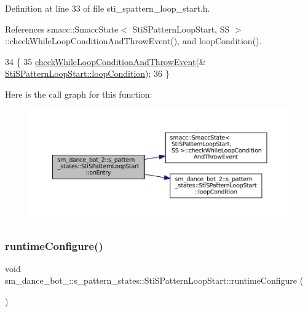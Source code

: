 Definition at line 33 of file sti\+\_\+spattern\+\_\+loop\+\_\+start.\+h.



References smacc\+::\+Smacc\+State$<$ Sti\+S\+Pattern\+Loop\+Start, S\+S $>$\+::check\+While\+Loop\+Condition\+And\+Throw\+Event(), and loop\+Condition().


\begin{DoxyCode}
34   \{
35     \hyperlink{classsmacc_1_1SmaccState_a80082718f226bebedb589f0c4696001d}{checkWhileLoopConditionAndThrowEvent}(&
      \hyperlink{structsm__dance__bot__2_1_1s__pattern__states_1_1StiSPatternLoopStart_afc9d41599d4ac143e063d19d647480dd}{StiSPatternLoopStart::loopCondition});
36   \}
\end{DoxyCode}
Here is the call graph for this function\+:
\nopagebreak
\begin{figure}[H]
\begin{center}
\leavevmode
\includegraphics[width=350pt]{structsm__dance__bot__2_1_1s__pattern__states_1_1StiSPatternLoopStart_aa42d37cd2af3150d8a5c140932eeb9ea_cgraph}
\end{center}
\end{figure}
\mbox{\label{structsm__dance__bot__2_1_1s__pattern__states_1_1StiSPatternLoopStart_a9285d532e157456abb87858ec9a4fb11}} 
\subsubsection{\texorpdfstring{runtime\+Configure()}{runtimeConfigure()}}
{\footnotesize\ttfamily void sm\+\_\+dance\+\_\+bot\+\_\+::s\+\_\+pattern\+\_\+states\+::\+Sti\+S\+Pattern\+Loop\+Start\+::runtime\+Configure (\begin{DoxyParamCaption}{ }\end{DoxyParamCaption})\hspace{0.3cm}{\ttfamily [inline]}}



